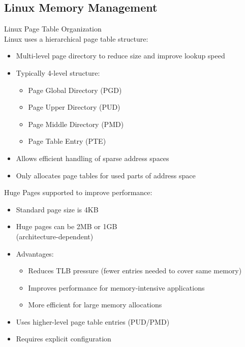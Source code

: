 \multend

\columnbreak

\subsection{Linux Memory Management}


\begin{definition}{Linux Page Table Organization}\\
    Linux uses a hierarchical page table structure:
    \begin{itemize}
        \item Multi-level page directory to reduce size and improve lookup speed
        \item Typically 4-level structure:
            \begin{itemize}
                \item Page Global Directory (PGD)
                \item Page Upper Directory (PUD)
                \item Page Middle Directory (PMD)
                \item Page Table Entry (PTE)
            \end{itemize}
        \item Allows efficient handling of sparse address spaces
        \item Only allocates page tables for used parts of address space
    \end{itemize}
\end{definition}

\begin{definition}{Huge Pages} supported to improve performance:
    \begin{itemize}
        \item Standard page size is 4KB
        \item Huge pages can be 2MB or 1GB \\(architecture-dependent)
        \item Advantages:
            \begin{itemize}
                \item Reduces TLB pressure (fewer entries needed to cover same memory)
                \item Improves performance for memory-intensive applications
                \item More efficient for large memory allocations
            \end{itemize}
        \item Uses higher-level page table entries (PUD/PMD)
        \item Requires explicit configuration
    \end{itemize}
\end{definition}

